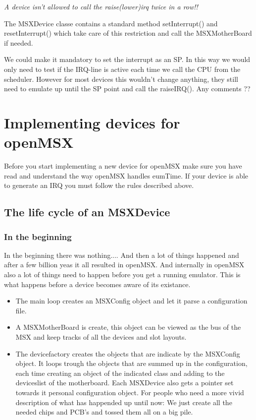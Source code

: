 \documentclass[11pt, a4paper]{report}
\begin{document}
\emph{A device isn't allowed to call the raise(lower)irq twice in a row!!}

The MSXDevice classe contains a standard method setInterrupt() and
resetInterrupt() which take care of this restriction and call the
MSXMotherBoard if needed.

We could make it mandatory to set the interrupt as an SP. In this way we
would only need to test if the IRQ-line is active each time we call the
CPU from the scheduler. However for most devices this wouldn't change
anything, they still need to emulate up until the SP point and call the
raiseIRQ(). Any comments ??

\chapter{Implementing devices for openMSX}
Before you start implementing a new device for openMSX make sure you have read and understand the way openMSX handles eumTime. If your device is able to generate an IRQ you must follow the rules described above.

\section{The life cycle of an MSXDevice}

\subsection{In the beginning}
In the beginning there was nothing....
And then a lot of things happened and after a few billion yeas it all resulted in openMSX. And internally in openMSX also a lot of things need to happen before you get a running emulator.
This is what happens before a device becomes aware of its existance.
\begin{itemize}
\item The main loop creates an MSXConfig object and let it parse a configuration file.
\item A MSXMotherBoard is create, this object can be viewed as the bus of the MSX and keep tracks of all the devices and slot layouts.
\item The devicefactory creates the objects that are indicate by the MSXConfig object. It loops trough the objects that are summed up in the configuration, each time creating an object of the indicated class and adding to the deviceslist of the motherboard. Each MSXDevice also gets a pointer set towards it personal configuration object. For people who need a more vivid description of what has happended up until now: We just create all the needed chips and PCB's and tossed them all on a big pile.
\end{itemize}
\end{document}
